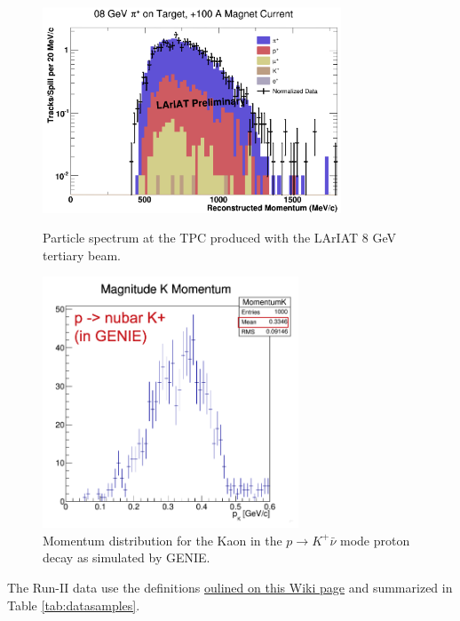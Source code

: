 \begin{figure}[h!]
\centering
\begin{minipage}{0.45\textwidth}
\centering
\includegraphics[width=3.5in]{images/Lariat/Beam}
\caption{Particle spectrum at the TPC produced with the LArIAT 8 GeV tertiary beam.}
\label{fig:BeamComp}
\end{minipage}\hfill
\centering
\begin{minipage}{0.45\textwidth}
\centering
\includegraphics[width=3in]{images/Lariat/KaonGenie}
\caption{Momentum distribution for the Kaon in the $p \rightarrow K^{+} \bar\nu$ mode proton decay as simulated by GENIE.}
\label{fig:KGenie}
\end{minipage}
\end{figure}




The Run-II data use the definitions \href{https://redmine.fnal.gov/redmine/projects/lardbt/wiki/Recommended_SAM_Datasets}{oulined on this Wiki page} and summarized in Table \ref{tab:datasamples}.

